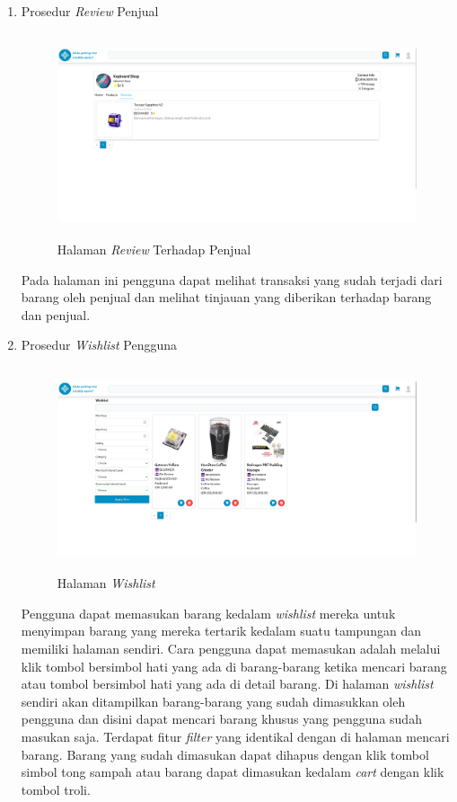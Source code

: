 \documentclass[a4paper]{article}
\begin{document}
\begin{enumerate}
\item Prosedur \textit{Review} Penjual

\begin{figure}[h]
    \centering
    \includegraphics*[height=6cm]{images/prosedur pengunaan aplikasi/Halaman Review Penjual.png}
    \caption{Halaman \textit{Review} Terhadap Penjual}
\end{figure}

Pada halaman ini pengguna dapat melihat transaksi yang sudah terjadi dari barang oleh penjual dan melihat tinjauan yang diberikan terhadap barang dan penjual.

\item Prosedur \textit{Wishlist} Pengguna

\begin{figure}[h]
    \centering
    \includegraphics*[height=6cm]{images/prosedur pengunaan aplikasi/Wishlist.png}
    \caption{Halaman \textit{Wishlist}}
\end{figure}

Pengguna dapat memasukan barang kedalam \textit{wishlist} mereka untuk menyimpan barang yang mereka tertarik kedalam suatu tampungan dan memiliki halaman sendiri. Cara pengguna dapat memasukan adalah melalui klik tombol bersimbol hati yang ada di barang-barang ketika mencari barang atau tombol bersimbol hati yang ada di detail barang. Di halaman \textit{wishlist} sendiri akan ditampilkan barang-barang yang sudah dimasukkan oleh pengguna dan disini dapat mencari barang khusus yang pengguna sudah masukan saja. Terdapat fitur \textit{filter} yang identikal dengan di halaman mencari barang. Barang yang sudah dimasukan dapat dihapus dengan klik tombol simbol tong sampah atau barang dapat dimasukan kedalam \textit{cart} dengan klik tombol troli.


\end{enumerate}
\end{document}
